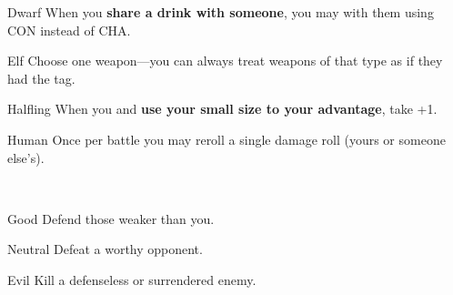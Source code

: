 \documentclass[8pt]{extarticle}
\begin{document}
\charbanner

\begin{minipage}[t]{3.2in}

\begin{optfeature}{Dwarf}
  When you \textbf{share a drink with someone}, you may 
  with them using CON instead of CHA.
\end{optfeature}

\begin{optfeature}{Elf}
  Choose one weapon—you can always treat weapons of that type as if
  they had the  tag.
\end{optfeature}

\begin{optfeature}{Halfling}
  When you  and \textbf{use your small size to your
    advantage}, take +1.
\end{optfeature}

\begin{optfeature}{Human}
  Once per battle you may reroll a single damage roll (yours or
  someone else’s).
\end{optfeature}

\ 


\begin{optfeature}{Good}
  Defend those weaker than you.
\end{optfeature}

\begin{optfeature}{Neutral}
  Defeat a worthy opponent.
\end{optfeature}

\begin{optfeature}{Evil}
  Kill a defenseless or surrendered enemy.
\end{optfeature}


\ 


\vfill\null
\end{minipage}
\end{document}
